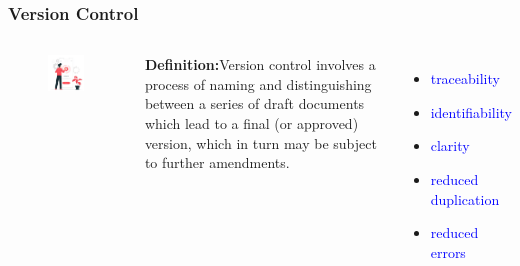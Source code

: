 \documentclass[newPxFont,sthlmFooter]{beamer}
\newcommand{\fs}{\footnotesize}
\begin{document}
\begin{frame}\frametitle{Version Control}
  \begin{columns}[T,onlytextwidth]
  \begin{figure}
    \centering
    \includegraphics[width=2in]{figs/vc} 
  \end{figure}
\fs {\bf Definition:}Version control involves a process of naming and distinguishing between a series of draft documents which lead to a final (or approved) version, which in turn may be subject to further amendments.\\
\begin{itemize}
  \fs
  \item \textcolor{blue}{traceability}
  \item \textcolor{blue}{identifiability}
  \item \textcolor{blue}{clarity}
  \item \textcolor{blue}{reduced duplication}
  \item \textcolor{blue}{reduced errors}
  \end{itemize}
  \end{columns}
\end{frame}
\end{document}
